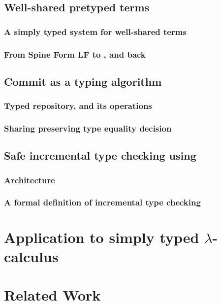 \documentclass[preprint,9pt,authoryear]{sigplanconf}
\begin{document}
\subsection{Well-shared pretyped terms}

\subsubsection{A simply typed system for well-shared terms}

\subsubsection{From Spine Form LF to {\system}, and back}

\subsection{Commit as a typing algorithm}

\subsubsection{Typed repository, and its operations}

\subsubsection{Sharing preserving type equality decision}

\subsection{Safe incremental type checking using {\system}}

\subsubsection{Architecture}

\subsubsection{A formal definition of incremental type checking}

\section{Application to simply typed $\lambda$-calculus}

\section{Related Work}
\end{document}
